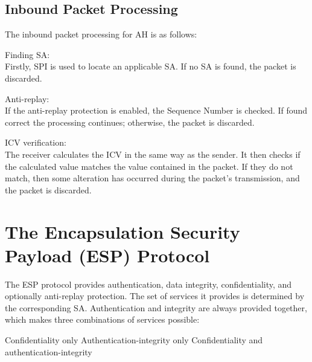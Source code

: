 \subsection{Inbound Packet Processing}
The inbound packet processing for AH is as follows:
\begin{outline}[enumerate]
\1 Finding SA:\\ Firstly, SPI is used to locate an applicable SA. If no SA is found, the packet is discarded.

\1 Anti-replay:\\ If the anti-replay protection is enabled, the Sequence Number is checked. If found correct the processing continues; otherwise, the packet is discarded.

\1 ICV verification:\\ The receiver calculates the ICV in the same way as the sender. It then checks if the calculated value matches the value contained in the packet. If they do not match, then some alteration has occurred during the packet's transmission, and the packet is discarded.
\end{outline}

\section{The Encapsulation Security Payload (ESP) Protocol}
The ESP protocol provides authentication, data integrity, confidentiality, and optionally anti-replay protection. The set of services it provides is determined by the corresponding SA. Authentication and integrity are always provided together, which makes three combinations of services possible:
\begin{outline}
\1 Confidentiality only
\1 Authentication-integrity only
\1 Confidentiality and authentication-integrity
\end{outline}

